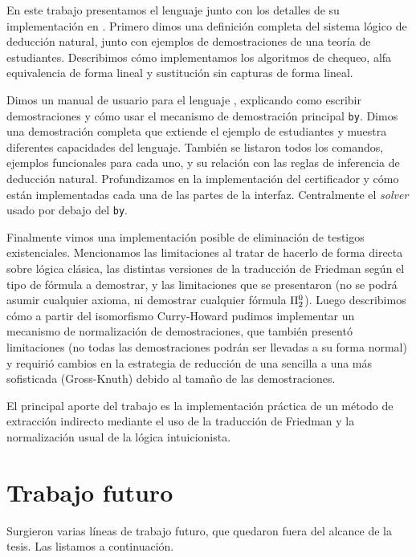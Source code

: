 En este trabajo presentamos el lenguaje \ppaLang{} junto con los detalles de su
implementación en \ppaTool{}. Primero dimos una definición completa del sistema
lógico de deducción natural, junto con ejemplos de demostraciones de una
teoría de estudiantes. Describimos cómo implementamos los algoritmos de chequeo,
alfa equivalencia de forma lineal y sustitución sin capturas de forma lineal.

Dimos un manual de usuario para el lenguaje \ppaLang{}, explicando como
escribir demostraciones y cómo usar el mecanismo de demostración principal
\lstinline{by}. Dimos una demostración completa que extiende el ejemplo de
estudiantes y muestra diferentes capacidades del lenguaje. También se listaron
todos los comandos, ejemplos funcionales para cada uno, y su relación con las
reglas de inferencia de deducción natural. Profundizamos en la implementación
del certificador y cómo están implementadas cada una de las partes de la
interfaz. Centralmente el \textit{solver} usado por debajo del \lstinline{by}.

Finalmente vimos una implementación posible de eliminación de testigos
existenciales. Mencionamos las limitaciones al tratar de hacerlo de forma
directa sobre lógica clásica, las distintas versiones de la traducción de
Friedman según el tipo de fórmula a demostrar, y las limitaciones que se
presentaron (no se podrá asumir cualquier axioma, ni demostrar cualquier fórmula
$\Pi^0_{2}$). Luego describimos cómo a partir del isomorfismo Curry-Howard
pudimos implementar un mecanismo de normalización de demostraciones, que también
presentó limitaciones (no todas las demostraciones podrán ser llevadas a su
forma normal) y requirió cambios en la estrategia de reducción de una sencilla a
una más sofisticada (Gross-Knuth) debido al tamaño de las demostraciones.

El principal aporte del trabajo es la implementación práctica de un método de
extracción indirecto mediante el uso de la traducción de Friedman y la
normalización usual de la lógica intuicionista.

\section{Trabajo futuro}

Surgieron varias líneas de trabajo futuro, que quedaron fuera del alcance de la
tesis. Las listamos a continuación.

